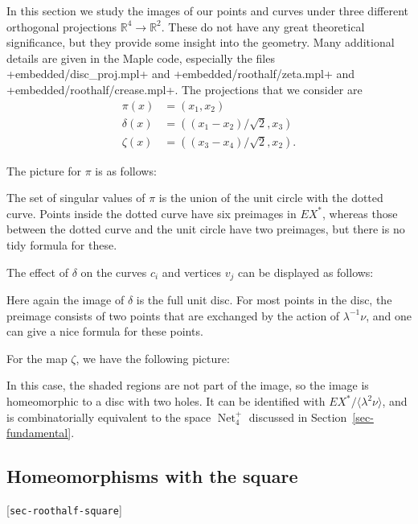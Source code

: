 \documentclass[reqno]{amsart}
\newcommand{\lbl}[1]{\label{#1}\textup{[\texttt{#1}]}\par}
\newcommand{\lbl}{\label}
\newcommand{\Net}	{\operatorname{Net}}
\newcommand{\dl}        {\delta}
\newcommand{\zt}        {\zeta}
\newcommand{\lm}        {\lambda}
\newcommand{\R}         {{\mathbb{R}}}
\newcommand{\ip}[1]     {\langle #1\rangle}
\newcommand{\rt}        {\sqrt{2}}
\renewcommand{\:}{\colon}
\theoremstyle{definition}
\begin{document}
In this section we study the images of our points and curves under
three different orthogonal projections $\R^4\to\R^2$.  These do not
have any great theoretical significance, but they provide some insight
into the geometry.  Many additional details are given in the Maple
code, especially the files \fname+embedded/disc_proj.mpl+ and
\fname+embedded/roothalf/zeta.mpl+ and
\fname+embedded/roothalf/crease.mpl+.
The projections that we consider are
\begin{align*}
 \pi(x) &= (x_1,x_2) \\
 \dl(x) &= ((x_1-x_2)/\rt,x_3) \\
 \zt(x) &= ((x_3-x_4)/\rt,x_2).
\end{align*}

The picture for $\pi$ is as follows:

The set of singular values of $\pi$ is the union of the unit circle
with the dotted curve.  Points inside the dotted curve have six
preimages in $EX^*$, whereas those between the dotted curve and the
unit circle have two preimages, but there is no tidy formula for
these.

The effect of $\dl$ on the curves $c_i$ and vertices $v_j$ can be
displayed as follows:

Here again the image of $\dl$ is the full unit disc.  For most points
in the disc, the preimage consists of two points that are exchanged by
the action of $\lm^{-1}\nu$, and one can give a nice formula for these
points.

For the map $\zt$, we have the following picture:

In this case, the shaded regions are not part of the image, so the
image is homeomorphic to a disc with two holes.  It can be identified
with $EX^*/\ip{\lm^2\nu}$, and is combinatorially equivalent to the
space $\Net_4^+$ discussed in Section~\ref{sec-fundamental}.

\subsection{Homeomorphisms with the square}
\lbl{sec-roothalf-square}
\end{document}
